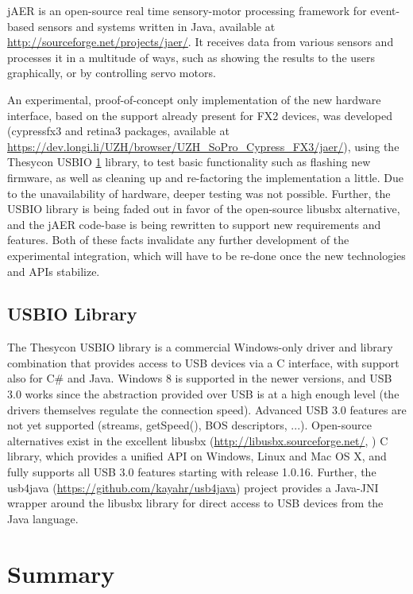 \documentclass[a4paper,12pt]{report}
\begin{document}
jAER is an open-source real time sensory-motor processing framework for event-based sensors and systems written in Java, available at \url{http://sourceforge.net/projects/jaer/}.
It receives data from various sensors and processes it in a multitude of ways, such as showing the results to the users graphically, or by controlling servo motors.

An experimental, proof-of-concept only implementation of the new hardware interface, based on the support already present for FX2 devices, was developed (cypressfx3 and retina3 packages, available at \url{https://dev.longi.li/UZH/browser/UZH\_SoPro\_Cypress\_FX3/jaer/}), using the Thesycon USBIO \ref{sec:usbio_library} library, to test basic functionality such as flashing new firmware, as well as cleaning up and re-factoring the implementation a little.
Due to the unavailability of hardware, deeper testing was not possible. Further, the USBIO library is being faded out in favor of the open-source libusbx alternative, and the jAER code-base is being rewritten to support new requirements and features. Both of these facts invalidate any further development of the experimental integration, which will have to be re-done once the new technologies and APIs stabilize.

\section{USBIO Library} \label{sec:usbio_library}

The Thesycon USBIO library \cite{USBIO} is a commercial Windows-only driver and library combination that provides access to USB devices via a C interface, with support also for C\# and Java.
Windows 8 is supported in the newer versions, and USB 3.0 works since the abstraction provided over USB is at a high enough level (the drivers themselves regulate the connection speed). Advanced USB 3.0 features are not yet supported (streams, getSpeed(), BOS descriptors, ...).
Open-source alternatives  exist in the excellent libusbx (\url{http://libusbx.sourceforge.net/}, \cite{AN73609}) C library, which provides a unified API on Windows, Linux and Mac OS X, and fully supports all USB 3.0 features starting with release 1.0.16. Further, the usb4java (\url{https://github.com/kayahr/usb4java}) project provides a Java-JNI wrapper around the libusbx library for direct access to USB devices from the Java language.

\chapter{Summary} \label{chap:summary}
\end{document}

